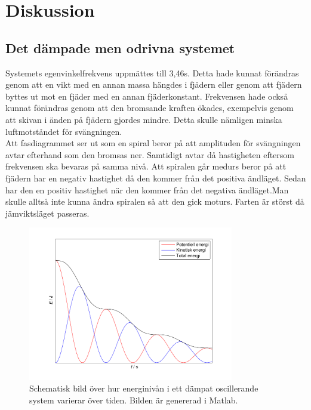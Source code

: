\documentclass[a4paper,10pt]{article}
\begin{document}
\section{Diskussion}
\subsection{Det dämpade men odrivna systemet}
Systemets egenvinkelfrekvens uppmättes till 3,46s. Detta hade kunnat förändras genom att en vikt med en annan massa hängdes i fjädern eller genom att fjädern byttes ut mot en fjäder med en annan fjäderkonstant. Frekvensen hade också kunnat förändras genom att den bromsande kraften ökades, exempelvis genom att skivan i änden på fjädern gjordes mindre. Detta skulle nämligen minska luftmotståndet för svängningen.\\

Att fasdiagrammet ser ut som en spiral beror på att amplituden för svängningen avtar efterhand som den bromsas ner. Samtidigt avtar då hastigheten eftersom frekvensen ska bevaras på samma nivå. Att spiralen går medurs beror på att fjädern har en negativ hastighet då den kommer från det positiva ändläget. Sedan har den en positiv hastighet när den kommer från det negativa ändläget.Man skulle alltså inte kunna ändra spiralen så att den gick moturs. Farten är störst då jämviktsläget passeras.\\

\begin{figure}[H]
\centering
\includegraphics[width=0.8\textwidth]{../bilder/energigraf_uppg1_ideal.pdf}
\caption{Schematisk bild över hur energinivån i ett dämpat oscillerande system varierar över tiden. Bilden är genererad i Matlab.}
\end{figure}
\end{document}

